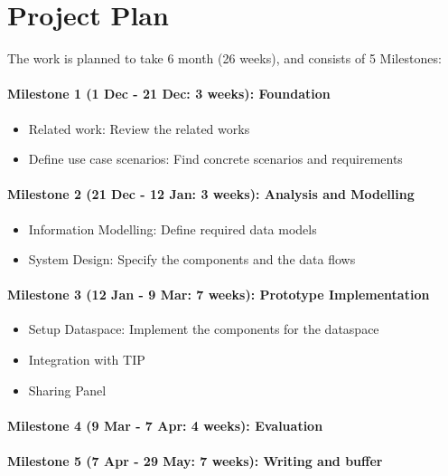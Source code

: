 \documentclass{article}
\begin{document}



\section{Project Plan} %
\label{sec:timeline}

The work is planned to take 6 month (26 weeks), and consists of 5 Milestones:

\paragraph*{Milestone 1 (1 Dec - 21 Dec: 3 weeks): Foundation} 
    \begin{itemize}
        \item Related work: Review the related works
        \item Define use case scenarios: Find concrete scenarios and requirements
    \end{itemize}
\paragraph*{Milestone 2 (21 Dec - 12 Jan: 3 weeks): Analysis and Modelling}
    \begin{itemize}
        \item Information Modelling: Define required data models
        \item System Design: Specify the components and the data flows
    \end{itemize}
\paragraph*{Milestone 3 (12 Jan - 9 Mar: 7 weeks): Prototype Implementation}
    \begin{itemize}
        \item Setup Dataspace: Implement the components for the dataspace
        \item Integration with TIP
        \item Sharing Panel
    \end{itemize}
\paragraph*{Milestone 4 (9 Mar - 7 Apr: 4 weeks): Evaluation}
\paragraph*{Milestone 5 (7 Apr - 29 May: 7 weeks): Writing and buffer}

 

\end{document}
